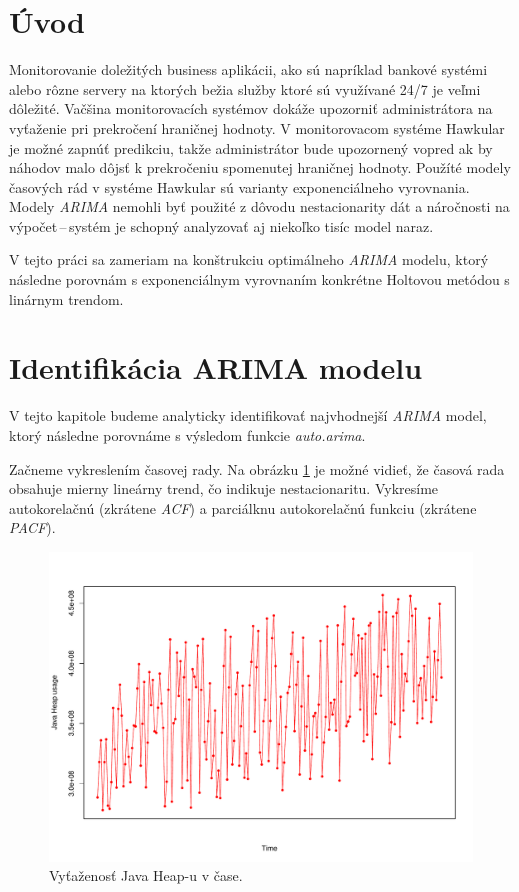 \documentclass[12pt,a4paper,oneside,final]{article}
\theoremstyle{definition}
\theoremstyle{remark}
\numberwithin{equation}{section}
\begin{document}
\VytvorTitulniStranu

\section{Úvod}
Monitorovanie doležitých business aplikácii, ako sú napríklad bankové systémi alebo rôzne
servery na ktorých bežia služby ktoré sú využívané 24/7 je veľmi dôležité. Vačšina
monitorovacích systémov dokáže upozorniť administrátora na vyťaženie pri prekročení
hraničnej hodnoty. V monitorovacom systéme Hawkular je možné zapnúť predikciu, takže
administrátor bude upozornený vopred ak by náhodov malo dôjsť k prekročeniu spomenutej
hraničnej hodnoty. Použíté modely časových rád v systéme Hawkular sú varianty
exponenciálneho vyrovnania. Modely \emph{ARIMA} nemohli byť použité z dôvodu nestacionarity dát 
a náročnosti na výpočet\,--\,systém je schopný analyzovať aj niekoľko tisíc model naraz. 

V tejto práci sa zameriam na konštrukciu optimálneho \emph{ARIMA} modelu, ktorý následne porovnám
s exponenciálnym vyrovnaním konkrétne Holtovou metódou s linárnym trendom.

\section{Identifikácia ARIMA modelu}
V tejto kapitole budeme analyticky identifikovať najvhodnejší \emph{ARIMA} model, ktorý následne 
porovnáme s výsledom funkcie \emph{auto.arima}.

Začneme vykreslením časovej rady. Na obrázku \ref{obr:heap} je možné vidieť, že časová rada 
obsahuje mierny lineárny trend, čo indikuje nestacionaritu. Vykresíme autokorelačnú 
(zkrátene \emph{ACF}) a parciálknu autokorelačnú funkciu (zkrátene \emph{PACF}).

\begin{figure}[H] 
    \begin{center}
        \includegraphics[width=.8\textwidth]{images/heap_series.pdf}
        \caption{Vyťaženosť Java Heap-u v čase.}
        \label{obr:heap} %
    \end{center}
\end{figure}
\end{document}
